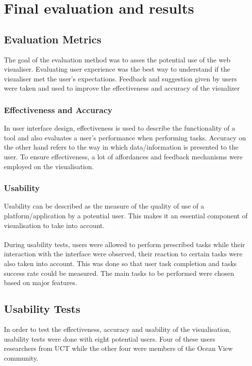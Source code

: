 \section{Final evaluation and results}
\subsection{Evaluation Metrics}
The goal of the evaluation method was to asses the potential use of the web visualiser. Evaluating user experience was the best way to understand if the visualiser met the user's expectations. Feedback and suggestion given by users were taken and used to improve the effectiveness and accuracy of the visualizer\cite{lam:hal-00723057}

\subsubsection{Effectiveness and Accuracy}
In user interface design, effectiveness is used to describe the functionality of a tool and  also evaluates a user's performance when performing tasks. Accuracy on the other hand refers to the way in which data/information is presented to the user. To ensure effectiveness, a lot of affordances and feedback mechanisms were employed on the visualisation.
\subsubsection{Usability}
Usability can be described as the measure of  the quality of use of a platform/application by a potential user. This makes it an essential component of visualisation to take into account\cite{1509067}.
\paragraph{}
During usability tests, users were allowed to perform prescribed tasks while their interaction with the interface were observed, their reaction to certain tasks were also taken into account. This was done so that user task completion and tasks success rate could be measured. The main tasks to be performed were chosen based on major features.


\subsection{Usability Tests}
In order to test the effectiveness, accuracy and usability of the visualisation, usability tests were done with eight potential users. Four of these users researchers from UCT while the other four were members of the Ocean View community. 
